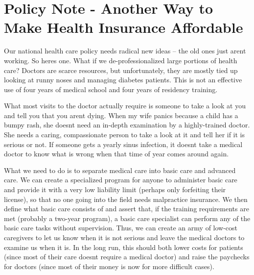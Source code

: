 \documentclass[letterpaper]{article}
\begin{document}
\section[Policy Note {}- Another Way to Make Health Insurance
Affordable]{Policy Note - Another Way to Make Health Insurance
Affordable}
{\color{black}
\textcolor[rgb]{0.32941177,0.5529412,0.83137256}{Our national health
care policy needs radical new ideas – the old ones just
aren{\textquotesingle}t working.  So here{\textquotesingle}s one.  What
if we
}de-professionalize\textcolor[rgb]{0.32941177,0.5529412,0.83137256}{d}
large portions of
\textcolor[rgb]{0.32941177,0.5529412,0.83137256}{health care?} Doctors
are scarce resources, but unfortunately, they are mostly tied up
looking at runny noses and managing diabetes patients. This is not an
effective use of four years of medical school and four years of
residency training.}

{\color{black}
What most visits to the doctor actually require is someone to take a
look at you and tell you that you aren{\textquotesingle}t dying. When
my wife panics because a child has a bumpy rash, she
doesn{\textquotesingle}t need an in-depth examination by a
highly-trained doctor. She needs a caring, compassionate person to take
a look at it and tell her if it is serious or not. If someone gets a
yearly sinus infection, it doesn{\textquotesingle}t take a medical
doctor to know what is wrong when that time of year comes around again.
}

{\color{black}
What we need to do is to separate medical care into {\textquotedbl}basic
care{\textquotedbl} and {\textquotedbl}advanced care.{\textquotedbl} We
can create a specialized program for anyone to administer
{\textquotedbl}basic care{\textquotedbl} and provide it with a very low
liability limit (perhaps only forfeiting their license), so that no one
going into the field needs malpractice insurance. We then define what
{\textquotedbl}basic care{\textquotedbl} consists of and assert that,
if the training requirements are met (probably a two-year program), a
basic care specialist can perform any of the basic care tasks without
supervision. Thus, we can create an army of low-cost caregivers to let
us know when it is not serious and leave the medical doctors to examine
us when it is. In the long run, this should both lower costs for
patients (since most of their care doesn{\textquotesingle}t require a
medical doctor) and raise the paychecks for doctors (since most of
their money is now for more difficult cases).}
\end{document}
